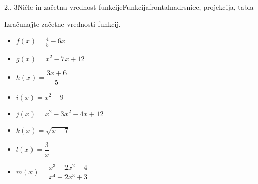 \begin{priprava}{2., 3}{}{Ničle in začetna vrednost funkcije}{Funkcija}{frontalna}{drsnice, projekcija, tabla}
    \begin{naloga}
        Izračunajte začetne vrednosti funkcij.
        \begin{multicols}{2}
            \begin{itemize}
                \item $f(x)=\frac{4}{5}-6x$ 
                \item $g(x)=x^2-7x+12$ 
                \item $h(x)=\dfrac{3x+6}{5}$ 
                \item $i(x)=x^2-9$ 
                \item $j(x)=x^2-3x^2-4x+12$ 
                \item $k(x)=\sqrt{x+7}$ 
                \item $l(x)=\dfrac{3}{x}$ 
                \item $m(x)=\dfrac{x^3-2x^2-4}{x^4+2x^3+3}$ 
            \end{itemize}
        \end{multicols}
    \end{naloga}



\end{priprava}